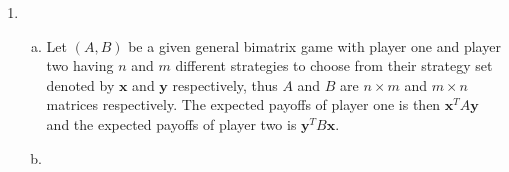 \documentclass[a4paper,12pt]{article}
\theoremstyle{definition}
\begin{document}
\begin{enumerate}
\item
\begin{enumerate}[(a)]
\item Let $(A,B)$ be a given general bimatrix game with player one and player two having $n$ and $m$ different strategies to choose from their strategy set denoted by $\mathbf{x}$ and $\mathbf{y}$ respectively, thus $A$ and $B$ are $n \times m$ and $m \times n$ matrices respectively. The expected payoffs of player one is then  $\mathbf{x}^TA\mathbf{y}$ and the expected payoffs of player two is $\mathbf{y}^TB\mathbf{x}$.
\item
\end{enumerate}


\end{enumerate}
\end{document}
